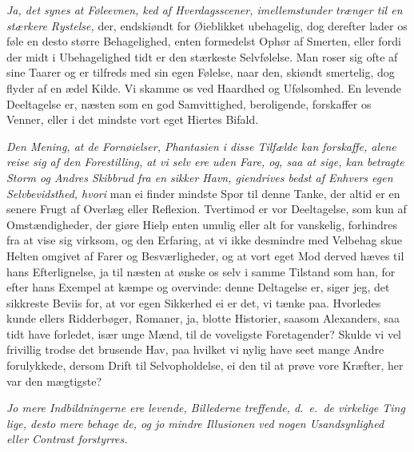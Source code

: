 \documentclass[12pt,a4paper]{article}
\newcommand{\opage}[1]{\marginnote{\footnotesize\textit{[#1]}}}
\begin{document}
\emph{Ja, det synes at Føleevnen, ked af Hverdagsscener, imellemstunder trænger til en
stærkere Rystelse,} der, endskiøndt for Øieblikket ubehagelig, dog derefter lader os føle
en desto større Behagelighed, enten formedelst Ophør af Smerten, eller fordi der midt i
Ubehagelighed tidt er den stærkeste Selvfølelse. Man roser sig ofte af sine Taarer og er
tilfreds med sin egen Følelse, naar den, skiøndt smertelig, dog flyder af en ædel Kilde. Vi
skamme os ved Haardhed og Ufølsomhed. En levende Deeltagelse er, næsten som en god
Samvittighed, beroligende, forskaffer os Venner, eller i det mindste vort eget Hiertes
Bifald.

\emph{Den Mening, at de Fornøielser, Phantasien i disse Tilfælde kan forskaffe, alene reise
sig af den Forestilling, at vi selv ere uden Fare, og, saa at sige, kan betragte Storm og
Andres Skibbrud fra en sikker Havn, giendrives bedst af Enhvers egen Selvbevidsthed, hvori}
man ei finder mindste Spor til denne Tanke, der altid er en senere Frugt af Overlæg eller
Reflexion. Tvertimod er vor Deeltagelse, som kun af Omstændigheder, der giøre Hielp enten
umulig eller alt for vanskelig, forhindres fra at vise sig virksom, og den Erfaring, at vi
ikke desmindre med Velbehag skue Helten omgivet af Farer og
\opage{241} Besværligheder, og at vort eget Mod derved hæves til hans Efterlignelse, ja til næsten at
ønske os selv i samme Tilstand som han, for efter hans Exempel at kæmpe og overvinde: denne
Deltagelse er, siger jeg, det sikkreste Beviis for, at vor egen Sikkerhed ei er det, vi
tænke paa. Hvorledes kunde ellers Ridderbøger, Romaner, ja, blotte Historier, saasom
Alexanders, saa tidt have forledet, især unge Mænd, til de voveligste Foretagender? Skulde
vi vel frivillig trodse det brusende Hav, paa hvilket vi nylig have seet mange Andre
forulykkede, dersom Drift til Selvopholdelse, ei den til at prøve vore Kræfter, her var den
mægtigste?

\emph{Jo mere Indbildningerne ere levende, Billederne treffende, d.~e.\ de virkelige Ting
lige, desto mere behage de, og jo mindre Illusionen ved nogen Usandsynlighed eller Contrast
forstyrres.}
\end{document}
